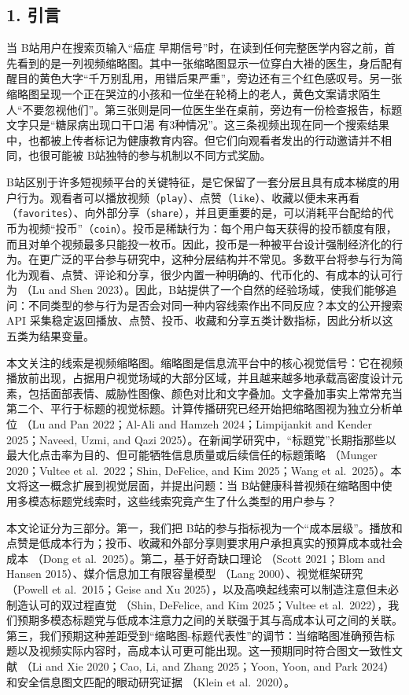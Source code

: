 \documentclass[
  fontset=none]{ctexart}
\begin{document}
\subsection{1. 引言}\label{ux5f15ux8a00}

当 B站用户在搜索页输入``癌症 早期信号''时，在读到任何完整医学内容之前，首先看到的是一列视频缩略图。其中一张缩略图显示一位穿白大褂的医生，身后配有醒目的黄色大字``千万别乱用，用错后果严重''，旁边还有三个红色感叹号。另一张缩略图呈现一个正在哭泣的小孩和一位坐在轮椅上的老人，黄色文案请求陌生人``不要忽视他们''。第三张则是同一位医生坐在桌前，旁边有一份检查报告，标题文字只是``糖尿病出现口干口渴 有3种情况''。这三条视频出现在同一个搜索结果中，也都被上传者标记为健康教育内容。但它们向观看者发出的行动邀请并不相同，也很可能被 B站独特的参与机制以不同方式奖励。

B站区别于许多短视频平台的关键特征，是它保留了一套分层且具有成本梯度的用户行为。观看者可以播放视频（\texttt{play}）、点赞（\texttt{like}）、收藏以便未来再看（\texttt{favorites}）、向外部分享（\texttt{share}），并且更重要的是，可以消耗平台配给的代币为视频``投币''（\texttt{coin}）。投币是稀缺行为：每个用户每天获得的投币额度有限，而且对单个视频最多只能投一枚币。因此，投币是一种被平台设计强制经济化的行为。在更广泛的平台参与研究中，这种分层结构并不常见。多数平台将参与行为简化为观看、点赞、评论和分享，很少内置一种明确的、代币化的、有成本的认可行为 （Lu and Shen 2023）。因此，B站提供了一个自然的经验场域，使我们能够追问：不同类型的参与行为是否会对同一种内容线索作出不同反应？本文的公开搜索 API 采集稳定返回播放、点赞、投币、收藏和分享五类计数指标，因此分析以这五类为结果变量。

本文关注的线索是视频缩略图。缩略图是信息流平台中的核心视觉信号：它在视频播放前出现，占据用户视觉场域的大部分区域，并且越来越多地承载高密度设计元素，包括面部表情、威胁性图像、颜色对比和文字叠加。文字叠加事实上常常充当第二个、平行于标题的视觉标题。计算传播研究已经开始把缩略图视为独立分析单位 （Lu and Pan 2022；Al-Ali and Hamzeh 2024；Limpijankit and Kender 2025；Naveed, Uzmi, and Qazi 2025）。在新闻学研究中，``标题党''长期指那些以最大化点击率为目的、但可能牺牲信息质量或后续信任的标题策略 （Munger 2020；Vultee et al.~2022；Shin, DeFelice, and Kim 2025；Wang et al.~2025）。本文将这一概念扩展到视觉层面，并提出问题：当 B站健康科普视频在缩略图中使用多模态标题党线索时，这些线索究竟产生了什么类型的用户参与？

本文论证分为三部分。第一，我们把 B站的参与指标视为一个``成本层级''。播放和点赞是低成本行为；投币、收藏和外部分享则要求用户承担真实的预算成本或社会成本 （Dong et al.~2025）。第二，基于好奇缺口理论 （Scott 2021；Blom and Hansen 2015）、媒介信息加工有限容量模型 （Lang 2000）、视觉框架研究 （Powell et al.~2015；Geise and Xu 2025），以及高唤起线索可以制造注意但未必制造认可的双过程直觉 （Shin, DeFelice, and Kim 2025；Vultee et al.~2022），我们预期多模态标题党与低成本注意力之间的关联强于其与高成本认可之间的关联。第三，我们预期这种差距受到``缩略图-标题代表性''的调节：当缩略图准确预告标题以及视频实际内容时，高成本认可更可能出现。这一预期同时符合图文一致性文献 （Li and Xie 2020；Cao, Li, and Zhang 2025；Yoon, Yoon, and Park 2024） 和安全信息图文匹配的眼动研究证据 （Klein et al.~2020）。
\end{document}
